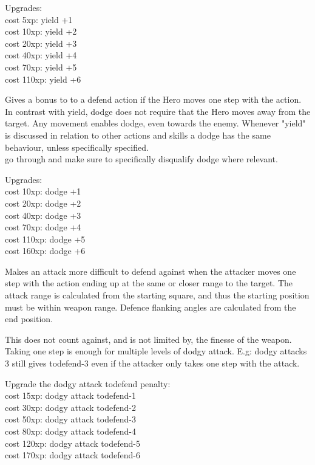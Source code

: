 Upgrades: \\
cost   5xp: yield +1 \\
cost  10xp: yield +2 \\
cost  20xp: yield +3 \\
cost  40xp: yield +4 \\
cost  70xp: yield +5 \\
cost 110xp: yield +6



Gives a bonus to to a defend action if the Hero moves one step with the action. In contrast with yield, dodge does not require that the Hero moves away from the target. Any movement enables dodge, even towards the enemy. Whenever "yield" is discussed in relation to other actions and skills a dodge has the same behaviour, unless specifically specified.\\
\todo go through and make sure to specifically disqualify dodge where relevant.

Upgrades: \\
cost  10xp: dodge +1 \\
cost  20xp: dodge +2 \\
cost  40xp: dodge +3 \\
cost  70xp: dodge +4 \\
cost 110xp: dodge +5 \\
cost 160xp: dodge +6


Makes an attack more difficult to defend against when the attacker moves one step with the action ending up at the same or closer range to the target. The attack range is calculated from the starting square, and thus the starting position must be within weapon range. Defence flanking angles are calculated from the end position.

This does not count against, and is not limited by, the finesse of the weapon. Taking one step is enough for multiple levels of dodgy attack. E.g: dodgy attacks 3 still gives todefend-3 even if the attacker only takes one step with the attack.

Upgrade the dodgy attack todefend penalty:\\
cost  15xp: dodgy attack todefend-1 \\
cost  30xp: dodgy attack todefend-2 \\
cost  50xp: dodgy attack todefend-3 \\
cost  80xp: dodgy attack todefend-4 \\
cost 120xp: dodgy attack todefend-5 \\
cost 170xp: dodgy attack todefend-6


